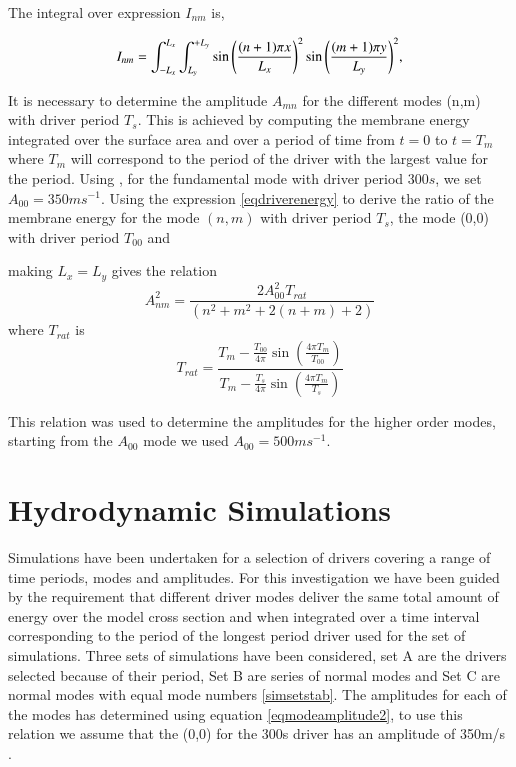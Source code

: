 \documentclass[final,1p]{elsarticle}
\begin{document}
The integral over expression $I_{nm}$ is,

\begin{equation}\label{eqdriverenergyintegral}
I_{nm}=  \int_{-L_{x}}^{L_{x}} \int_{L_{y}}^{+L_{y}} \sin{\left(  {(n+1)\pi x}\over{L_x} \right)}^{2}   \sin{\left(  {(m+1)\pi y}\over{L_y} \right)}^{2}   ,
\end{equation}

It is necessary to determine the amplitude $A_{mn}$ for the different modes (n,m) with driver period $T_{s}$. This is achieved by computing the membrane energy integrated over the surface area and over a period of time from $t=0$ to $t=T_{m}$ where $T_m$ will correspond to the period of the driver with the largest value for the period.
Using   \cite{Leighton1960} , for the fundamental mode with driver period $300s$, we set $A_{00}=350ms^{-1}$. 
Using the expression \eqref{eqdriverenergy} to derive the ratio of the membrane energy for the mode $(n,m)$ with driver period $T_{s}$, the mode (0,0) with driver period $T_{00}$ and %

making $L_x=L_y$ gives the relation
\begin{equation}\label{eqmodeamplitude2}
A_{nm}^{2}=\frac{2A_{00}^{2}T_{rat}}{(n^2+m^2+2(n+m)+2)}
\end{equation}
where $T_{rat}$ is
\begin{equation}\label{eqtrat}
T_{rat}=
\frac{T_m-\frac{T_{00}}{4\pi}   \sin(\frac{4\pi T_m}{T_{00}})    }{T_m-\frac{T_{s}}{4\pi}   \sin(\frac{4\pi T_m}{T_{s}})  }
\end{equation}

This relation was used to determine the amplitudes for the higher order modes, starting from the $A_{00}$ mode we used  $A_{00}=500ms^{-1}$.



\section{Hydrodynamic Simulations}
Simulations have been undertaken for a selection of drivers covering a range of time periods, modes and amplitudes. For this investigation we have been guided by the requirement that  different driver modes deliver the same total amount of energy over the model cross section and when integrated over a time interval corresponding to the period of the longest period driver used for the set of simulations. Three sets of simulations have been considered, set A are the drivers selected because of their period, Set B are series of normal modes and Set C  are normal modes with equal mode numbers \ref{simsetstab}. The amplitudes for each of the modes has determined using  equation \eqref{eqmodeamplitude2}, to use this relation we assume that the (0,0) for the 300s driver has an amplitude of 350m/s \cite{Leighton1960}.
\end{document}
